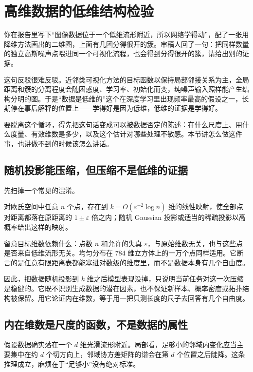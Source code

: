 \section{高维数据的低维结构检验}
\label{sec:14-Deep-Learning/10-Interpretability-Mathematics/03}

你在报告里写下``图像数据位于一个低维流形附近，所以网络学得动''，配了一张用降维方法画出的二维图，上面有几团分得很开的簇。审稿人回了一句：把同样数量的独立高斯噪声点喂进同一个可视化流程，也会得到分得很开的簇，请给出别的证据。

这句反驳很难反驳。近邻类可视化方法的目标函数以保持局部邻接关系为主，全局距离和簇的分离程度会随困惑度、学习率、初始化而变，纯噪声输入照样能产生结构分明的图。于是``数据是低维的''这个在深度学习里出现频率最高的假设之一，长期停在事后解释的位置上——学得好是因为低维，低维的证据是学得好。

要脱离这个循环，得先把这句话变成可以被数据否定的陈述：在什么尺度上、用什么度量、有效维数是多少，以及这个估计对哪些处理不敏感。本节讲怎么做这件事，也讲做不到的时候该怎么讲话。

\subsection{随机投影能压缩，但压缩不是低维的证据}

先扫掉一个常见的混淆。

\begin{theorem}
对欧氏空间中任意 \(n\) 个点，存在到 \(k=O(\varepsilon^{-2}\log n)\) 维的线性映射，使全部点对距离都落在原距离的 \(1\pm\varepsilon\) 倍之内；随机 Gaussian 投影或适当的稀疏投影以高概率给出这样的映射。
\end{theorem}

留意目标维数依赖什么：点数 \(n\) 和允许的失真 \(\varepsilon\)，与原始维数无关，也与这些点是否来自低维流形无关。均匀分布在 784 维立方体上的一万个点同样适用。它断言的是任意有限距离表都能塞进对数级的维度里，而不是数据本身有几个自由度。

因此，把数据随机投影到 \(k\) 维之后模型表现没掉，只说明当前任务对这一次压缩是稳健的。它既不识别生成数据的潜在因素，也不保证新样本、概率密度或拓扑结构被保留。用它论证内在维数，等于用一把只测长度的尺子去回答有几个自由度。

\subsection{内在维数是尺度的函数，不是数据的属性}

假设数据确实落在一个 \(d\) 维光滑流形附近。局部看，足够小的邻域内变化应当主要集中在约 \(d\) 个切方向上，邻域协方差矩阵的谱会在第 \(d\) 个位置之后陡降。这条推理成立，麻烦在于``足够小''没有绝对标准。

